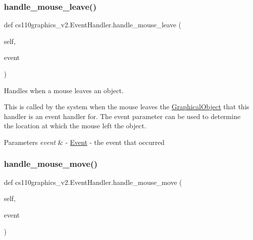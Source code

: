 \subsubsection{\texorpdfstring{handle\_mouse\_leave()}{handle\_mouse\_leave()}}
{\footnotesize\ttfamily def cs110graphics\+\_\+v2.\+Event\+Handler.\+handle\+\_\+mouse\+\_\+leave (\begin{DoxyParamCaption}\item[{}]{self,  }\item[{}]{event }\end{DoxyParamCaption})}



Handles when a mouse leaves an object. 

This is called by the system when the mouse leaves the \mbox{\hyperlink{classcs110graphics__v2_1_1GraphicalObject}{Graphical\+Object}} that this handler is an event handler for. The event parameter can be used to determine the location at which the mouse left the object. 
\begin{DoxyCode}{0}
\end{DoxyCode}
 
\begin{DoxyParams}{Parameters}
{\em event} & -\/ \mbox{\hyperlink{classcs110graphics__v2_1_1Event}{Event}} -\/ the event that occurred \\
\hline
\end{DoxyParams}
\mbox{\label{classcs110graphics__v2_1_1EventHandler_a33ee3347d8a4d0235ebc1f2e9f900699}} 
\subsubsection{\texorpdfstring{handle\_mouse\_move()}{handle\_mouse\_move()}}
{\footnotesize\ttfamily def cs110graphics\+\_\+v2.\+Event\+Handler.\+handle\+\_\+mouse\+\_\+move (\begin{DoxyParamCaption}\item[{}]{self,  }\item[{}]{event }\end{DoxyParamCaption})}




